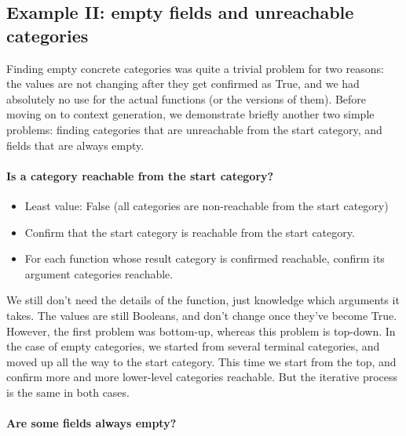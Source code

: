 \subsection{Example II: empty fields and unreachable categories}

Finding empty concrete categories was quite a trivial problem for two
reasons: the values are not changing after they get confirmed as True,
and we had absolutely no use for the actual \gf{} functions (or the
\pmcfg{} versions of them).  Before moving on to context generation,
we demonstrate briefly another two simple problems: finding categories
that are unreachable from the start category, and fields that are
always empty.

\paragraph{Is a category reachable from the start category?}

\begin{itemize}
\setlength\itemsep{0em}
\item Least value: False (all categories are non-reachable from the start category)
\item Confirm that the start category is reachable from the start category.
\item For each function whose result category is confirmed reachable, confirm its argument categories reachable.
\end{itemize}

\noindent We still don’t need the details of the function, just knowledge which arguments it takes. The values are still Booleans, and don’t change once they’ve become True.
However, the first problem was bottom-up, whereas this problem is
top-down. In the case of empty categories, we started from several terminal categories, and moved up all the way to the start category. This time we start from the top, and confirm more and more lower-level categories reachable. But the iterative process is the same in both cases.

\paragraph{Are some fields always empty?}

